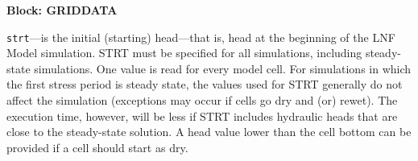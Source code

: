 
\item \textbf{Block: GRIDDATA}

\begin{description}
\item \texttt{strt}---is the initial (starting) head---that is, head at the beginning of the LNF Model simulation.  STRT must be specified for all simulations, including steady-state simulations. One value is read for every model cell. For simulations in which the first stress period is steady state, the values used for STRT generally do not affect the simulation (exceptions may occur if cells go dry and (or) rewet). The execution time, however, will be less if STRT includes hydraulic heads that are close to the steady-state solution.  A head value lower than the cell bottom can be provided if a cell should start as dry.

\end{description}

